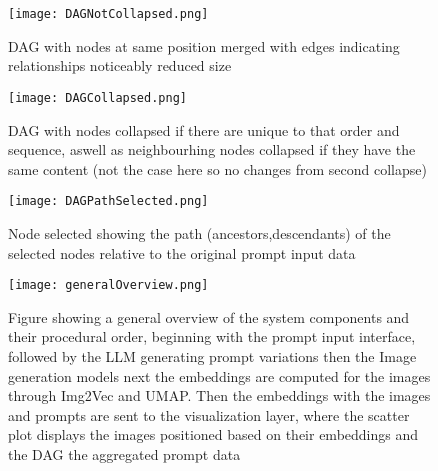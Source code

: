 \documentclass[
  a4paper,  %
  twoside,  %
  bibliography=totoc,
  headsepline,
  cleardoublepage=empty,
  parskip=half,
  draft=false
]{scrbook}
\begin{document}
\begin{figure}[H]
	\centering
	\texttt{[image: DAGNotCollapsed.png]}
	\caption{DAG with nodes at same position merged with edges indicating relationships noticeably reduced size }
	\label{fig:dagMerged}
\end{figure}
\begin{figure}[H]
	\centering
	\texttt{[image: DAGCollapsed.png]}
	\caption{DAG with nodes collapsed if there are unique to that order and sequence, aswell as neighbourhing nodes collapsed if they have the same content (not the case here so no changes from second collapse)}
	\label{fig:dagCollapsed}
\end{figure}
\begin{figure}[H]
	\centering
	\texttt{[image: DAGPathSelected.png]}
	\caption{Node selected showing the path (ancestors,descendants) of the selected nodes relative to the original prompt input data}
	\label{fig:dagPath}
\end{figure}





















\begin{figure}[H]        %
	\centering           %
	\texttt{[image: generalOverview.png]}
	\caption{Figure showing a general overview of the system components and their procedural order, beginning with the  prompt input interface, followed by the LLM generating prompt variations then the Image generation models next the embeddings are computed for the images through Img2Vec and UMAP. Then the embeddings with the images  and prompts are sent to the visualization layer, where the scatter plot displays the images positioned based on their embeddings and the DAG the aggregated prompt data}
	\label{fig:system-overview}  %
\end{figure}
\end{document}
